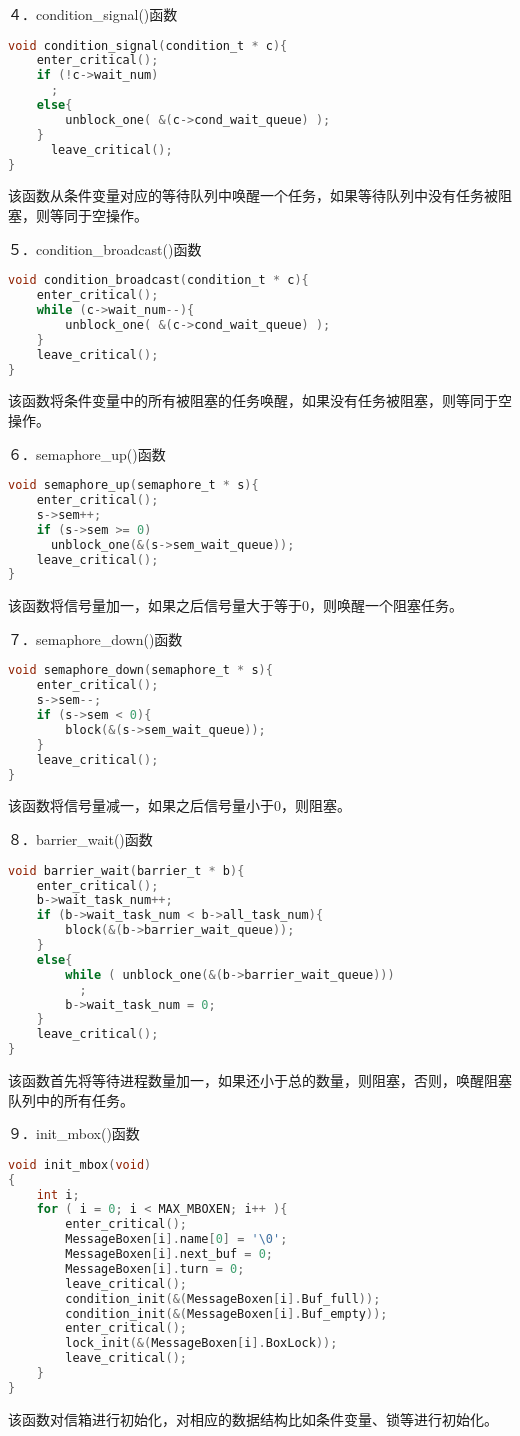 \documentclass[UTF8,noindent]{ctexart}
\begin{document}
４．condition\_signal()函数
\begin{lstlisting}[language=c]
void condition_signal(condition_t * c){
	enter_critical();
	if (!c->wait_num)
	  ;
	else{
		unblock_one( &(c->cond_wait_queue) );
	}
	  leave_critical();
}
\end{lstlisting}
该函数从条件变量对应的等待队列中唤醒一个任务，如果等待队列中没有任务被阻塞，则等同于空操作。


５．condition\_broadcast()函数
\begin{lstlisting}[language=c]
void condition_broadcast(condition_t * c){
	enter_critical();
	while (c->wait_num--){
		unblock_one( &(c->cond_wait_queue) );
	}
	leave_critical();
}
\end{lstlisting}
该函数将条件变量中的所有被阻塞的任务唤醒，如果没有任务被阻塞，则等同于空操作。

６．semaphore\_up()函数
\begin{lstlisting}[language=c]
void semaphore_up(semaphore_t * s){
	enter_critical();
	s->sem++;
	if (s->sem >= 0)
	  unblock_one(&(s->sem_wait_queue));
	leave_critical();
}
\end{lstlisting}
该函数将信号量加一，如果之后信号量大于等于$0$，则唤醒一个阻塞任务。

７．semaphore\_down()函数
\begin{lstlisting}[language=c]
void semaphore_down(semaphore_t * s){
	enter_critical();
	s->sem--;
	if (s->sem < 0){
		block(&(s->sem_wait_queue));
	}
	leave_critical();
}
\end{lstlisting}
该函数将信号量减一，如果之后信号量小于$0$，则阻塞。

８．barrier\_wait()函数
\begin{lstlisting}[language=c]
void barrier_wait(barrier_t * b){
	enter_critical();
	b->wait_task_num++;
	if (b->wait_task_num < b->all_task_num){
		block(&(b->barrier_wait_queue));
	}
	else{
		while ( unblock_one(&(b->barrier_wait_queue)))
		  ;
		b->wait_task_num = 0;
	}
	leave_critical();
}
\end{lstlisting}
该函数首先将等待进程数量加一，如果还小于总的数量，则阻塞，否则，唤醒阻塞队列中的所有任务。

９．init\_mbox()函数
\begin{lstlisting}[language=c]
void init_mbox(void)
{
	int i;
	for ( i = 0; i < MAX_MBOXEN; i++ ){
		enter_critical();
		MessageBoxen[i].name[0] = '\0';
		MessageBoxen[i].next_buf = 0;
		MessageBoxen[i].turn = 0;
		leave_critical();
		condition_init(&(MessageBoxen[i].Buf_full));
		condition_init(&(MessageBoxen[i].Buf_empty));
		enter_critical();
		lock_init(&(MessageBoxen[i].BoxLock));
		leave_critical();
	}
}
\end{lstlisting}
该函数对信箱进行初始化，对相应的数据结构比如条件变量、锁等进行初始化。
\end{document}
